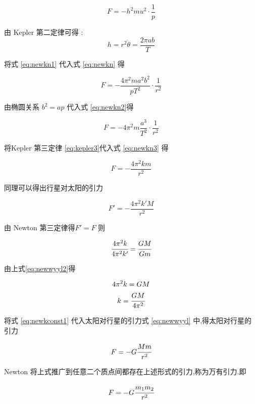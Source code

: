 \begin{equation}
  F=-h^2mu^2\cdot\frac{1}{p}
  \label{eq:newkn}
\end{equation}

由 Kepler 第二定律可得 :
\begin{equation}
   h=r^2\dot \theta =\frac{2\pi ab}{T}
  \label{eq:newkn1}
\end{equation}

将式 \eqref{eq:newkn1} 代入式 \eqref{eq:newkn} 得

\begin{equation}
  F=-\frac{4\pi^2ma^2b^2}{pT^2}\cdot \frac{1}{r^2}
  \label{eq:newkn2}
\end{equation}

由椭圆关系 $b^2=ap$ 代入式 \eqref{eq:newkn2}得

\begin{equation}
  F=-4\pi^2m\frac{a^3}{T^2}\cdot \frac{1}{r^2}
  \label{eq:newkn3}
\end{equation}

将Kepler 第三定律 \eqref{eq:kepler3}代入式 \eqref{eq:newkn3} 得

\begin{equation}
  F=-\frac{4\pi^2km}{r^2}
  \label{eq:newwyyl}
\end{equation}

同理可以得出行星对太阳的引力

\begin{equation}
  F'=-\frac{4\pi^2k'M}{r^2}
  \label{eq:newwyyl1}
\end{equation}

由 Newton 第三定律得$F'=F$ 则

\begin{equation}
  \cfrac{4\pi^2k}{4\pi^2k'}=\cfrac{GM}{Gm}
  \label{eq:newwyyl2}
\end{equation}

由上式\eqref{eq:newwyyl2}得

\begin{gather}
  4\pi^2k=GM \label{eq:newkconst1}\\
  k=\cfrac{GM}{4\pi^2}
  \label{eq:newkconst}
\end{gather}

将式 \eqref{eq:newkconst1} 代入太阳对行星的引力式 \eqref{eq:newwyyl} 中,得太阳对行星的引力

\begin{equation}
  F=-G\cfrac{Mm}{r^2}
  \label{eq:newwyyl3}
\end{equation}

Newton 将上式推广到任意二个质点间都存在上述形式的引力,称为万有引力.即

\begin{equation}
  F=-G\cfrac{m_1m_2}{r^2}
  \label{eq:newwyyl4}
\end{equation}
